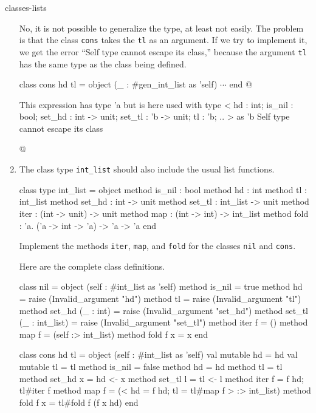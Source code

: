 \begin{exercise}{classes-lists}
\begin{enumerate}
\begin{answer}\ifanswers
No, it is not possible to generalize the type, at least not easily.
The problem is that the class \hbox{\lstinline/cons/} takes the \hbox{\lstinline/tl/} as an argument.
If we try to implement it, we get the error ``Self type cannot escape its class,''
because the argument \hbox{\lstinline/tl/} has the same type as the class being defined.

\begin{ocaml}
class cons hd tl =
object (_ : #gen_int_list as 'self)
$\cdots$
end
@
\begin{topoutput}
      This expression has type 'a but is here used with type
        < hd : int; is_nil : bool; set_hd : int -> unit; set_tl : 'b -> unit;
          tl : 'b; .. >
        as 'b
      Self type cannot escape its class
\end{topoutput}
@
\end{ocaml}
\fi\end{answer}

\item

The class type \hbox{\lstinline/int_list/} should also include the usual list functions.

\begin{ocaml}
class type int_list =
object
    method is_nil : bool
    method hd : int
    method tl : int_list
    method set_hd : int -> unit
    method set_tl : int_list -> unit
    method iter : (int -> unit) -> unit
    method map  : (int -> int) -> int_list
    method fold : 'a. ('a -> int -> 'a) -> 'a -> 'a
end
\end{ocaml}
%
Implement the methods \hbox{\lstinline/iter/}, \hbox{\lstinline/map/}, and \hbox{\lstinline/fold/} for the
classes \hbox{\lstinline/nil/} and \hbox{\lstinline/cons/}.

\begin{answer}\ifanswers
Here are the complete class definitions.
\begin{ocaml}
class nil =
object (self : #int_list as 'self)
   method is_nil = true
   method hd = raise (Invalid_argument "hd")
   method tl = raise (Invalid_argument "tl")
   method set_hd (_ : int) = raise (Invalid_argument "set_hd")
   method set_tl (_ : int_list) = raise (Invalid_argument "set_tl")
   method iter f = ()
   method map f = (self :> int_list)
   method fold f x = x
end

class cons hd tl =
object (self : #int_list as 'self)
   val mutable hd = hd
   val mutable tl = tl
   method is_nil = false
   method hd = hd
   method tl = tl
   method set_hd x = hd <- x
   method set_tl l = tl <- l
   method iter f = f hd; tl#iter f
   method map f = ({< hd = f hd; tl = tl#map f >} :> int_list)
   method fold f x = tl#fold f (f x hd)
end
\end{ocaml}
\fi\end{answer}
\end{enumerate}
\end{exercise}

